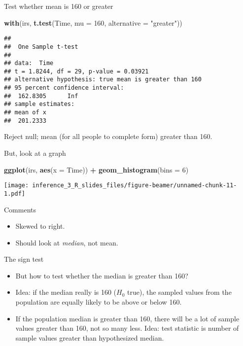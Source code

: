 \documentclass[
  ignorenonframetext,
]{beamer}
\newenvironment{Shaded}{\begin{snugshade}}{\end{snugshade}}
\newcommand{\DataTypeTok}[1]{\textcolor[rgb]{0.13,0.29,0.53}{#1}}
\newcommand{\DecValTok}[1]{\textcolor[rgb]{0.00,0.00,0.81}{#1}}
\newcommand{\KeywordTok}[1]{\textcolor[rgb]{0.13,0.29,0.53}{\textbf{#1}}}
\newcommand{\NormalTok}[1]{#1}
\newcommand{\OperatorTok}[1]{\textcolor[rgb]{0.81,0.36,0.00}{\textbf{#1}}}
\newcommand{\StringTok}[1]{\textcolor[rgb]{0.31,0.60,0.02}{#1}}
\providecommand{\tightlist}{%
  \setlength{\itemsep}{0pt}\setlength{\parskip}{0pt}}
\begin{document}
\begin{frame}[fragile]{Test whether mean is 160 or greater}
\protect\hypertarget{test-whether-mean-is-160-or-greater}{}
\begin{Shaded}
\begin{Highlighting}[]
\KeywordTok{with}\NormalTok{(irs, }\KeywordTok{t.test}\NormalTok{(Time, }\DataTypeTok{mu =} \DecValTok{160}\NormalTok{, }
                 \DataTypeTok{alternative =} \StringTok{"greater"}\NormalTok{))}
\end{Highlighting}
\end{Shaded}

\begin{verbatim}
## 
##  One Sample t-test
## 
## data:  Time
## t = 1.8244, df = 29, p-value = 0.03921
## alternative hypothesis: true mean is greater than 160
## 95 percent confidence interval:
##  162.8305      Inf
## sample estimates:
## mean of x 
##  201.2333
\end{verbatim}

Reject null; mean (for all people to complete form) greater than 160.
\end{frame}

\begin{frame}[fragile]{But, look at a graph}
\protect\hypertarget{but-look-at-a-graph}{}
\begin{Shaded}
\begin{Highlighting}[]
\KeywordTok{ggplot}\NormalTok{(irs, }\KeywordTok{aes}\NormalTok{(}\DataTypeTok{x =}\NormalTok{ Time)) }\OperatorTok{+}\StringTok{ }\KeywordTok{geom\_histogram}\NormalTok{(}\DataTypeTok{bins =} \DecValTok{6}\NormalTok{)}
\end{Highlighting}
\end{Shaded}

\texttt{[image: inference\_3\_R\_slides\_files/figure-beamer/unnamed-chunk-11-1.pdf]}
\end{frame}

\begin{frame}{Comments}
\protect\hypertarget{comments}{}
\begin{itemize}
\tightlist
\item
  Skewed to right.
\item
  Should look at \emph{median}, not mean.
\end{itemize}
\end{frame}

\begin{frame}{The sign test}
\protect\hypertarget{the-sign-test}{}
\begin{itemize}
\tightlist
\item
  But how to test whether the median is greater than 160?
\item
  Idea: if the median really is 160 (\(H_0\) true), the sampled values
  from the population are equally likely to be above or below 160.
\item
  If the population median is greater than 160, there will be a lot of
  sample values greater than 160, not so many less. Idea: test statistic
  is number of sample values greater than hypothesized median.
\end{itemize}
\end{frame}
\end{document}
